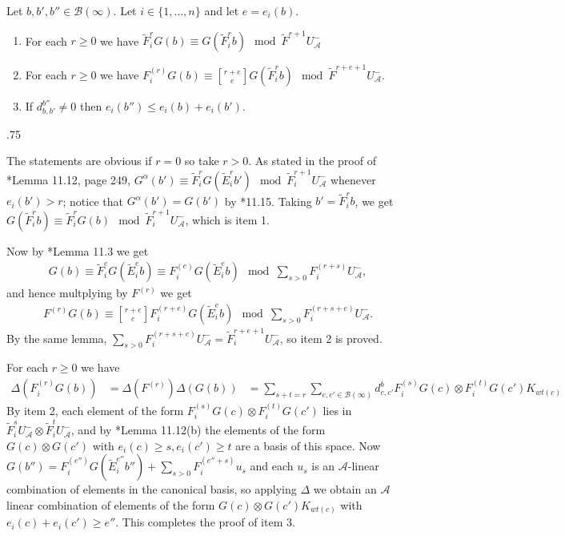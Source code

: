 \documentclass[11pt,fleqn]{article}
\makeatletter
\renewenvironment{proof}[1][\textit{Proof}]{\par
  \pushQED{\qed}%
  \normalfont \topsep.75\paraskip\relax
  \trivlist
  \item[\hskip\labelsep
        \itshape
    #1\@addpunct{.}]\ignorespaces
}{%
  \popQED\endtrivlist\@endpefalse
}
\newcommand\ot{\otimes}
\newcommand\qbinom[2]{\genfrac{[}{]}{0pt}{1}{#1}{#2}}
\newcommand\A{\mathcal A}
\newcommand\B{\mathcal B}
\makeatother
\begin{document}
\begin{Lemma}
Let $b,b',b'' \in \B(\infty)$. Let $i \in \{1, \ldots, n\}$ and let 
$e = e_i(b)$.
\begin{enumerate}
\item For each $r \geq 0$ we have $\tilde F_i^r G(b) \equiv G(\tilde F_i^r b)
\mod \tilde F^{r+1} U_\A^-$  

\item For each $r \geq 0$ we have $F_i^{(r)} G(b) \equiv \qbinom{r+e}{e} 
G(\tilde F_i^r b) \mod \tilde F^{r+e+1} U_\A^-$.

\item If $d_{b,b'}^{b''} \neq 0$ then $e_i(b'') \leq e_i(b) + e_i(b')$.
\end{enumerate}
\end{Lemma}
\begin{proof}
The statements are obvious if $r = 0$ so take $r > 0$.
As stated in the proof of \cite{Jan}*{Lemma 11.12}, page 249, $G^\alpha(b') 
\equiv \tilde F_i^r  G(\tilde E_i^r b') \mod \tilde F_i^{r+1} U^-_\A$ whenever
$e_i(b') > r$; notice that $G^\alpha(b') = G(b')$ by \cite{Jan}*{11.15}. 
Taking $b' = \tilde F_i^r b$, we get $G(\tilde F_i^r b) \equiv \tilde F_i^r 
G(b) \mod \tilde F_i^{r+1}U_\A^-$, which is item 1. 

Now by \cite{Jan}*{Lemma 11.3} we get
\begin{align*}
G(b) 
  \equiv \tilde F_i^e G(\tilde E_i^e b) 
  \equiv F_i^{(e)} G(\tilde E_i^e b) 
  \mod \sum_{s > 0} F_i^{(r+s)} U_\A^-,
\end{align*}
and hence multplying by $F^{(r)}$ we get
\begin{align*}
F^{(r)} G(b) 
  \equiv \qbinom{r+e}{e} F_i^{(r+e)} G(\tilde E_i^e b) 
  \mod \sum_{s > 0} F_i^{(r+s+e)} U_\A^-.
\end{align*}
By the same lemma, $\sum_{s > 0} F_i^{(r+s+e)} U_\A^- = \tilde F_i^{r+e+1} 
U_\A^-$, so item 2 is proved. 

For each $r \geq 0$ we have
\begin{align*}
\Delta(F_i^{(r)}G(b))
  &= \Delta(F^{(r)}) \Delta(G(b))
  &= \sum_{s+t = r} \sum_{c,c' \in \B(\infty)} 
    d_{c,c'}^b F_i^{(s)} G(c) \ot F_i^{(t)} G(c') K_{wt(c)}
\end{align*}
By item 2, each element of the form $F_i^{(s)} G(c) \ot F_i^{(t)} G(c')$
lies in $\tilde F_i^s U_\A^- \ot \tilde F_i^t U_\A^-$, and by 
\cite{Jan}*{Lemma 11.12(b)} the elements of the form $G(c) \ot G(c')$ with 
$e_i(c) \geq s, e_i(c') \geq t$ are a basis of this space. Now $G(b'') = 
F_i^{(e'')} G(\tilde E_i^{e''} b'') + \sum_{s>0} F_i^{(e''+s)} u_s$ and each 
$u_s$ is an $\A$-linear combination of elements in the canonical basis, so 
applying $\Delta$ we obtain an $\A$ linear combination of elements of the form 
$G(c)\ot G(c')K_{wt(c)}$ with $e_i(c) + e_i(c') \geq e''$. This completes the 
proof of item 3.
\end{proof}
\end{document}
